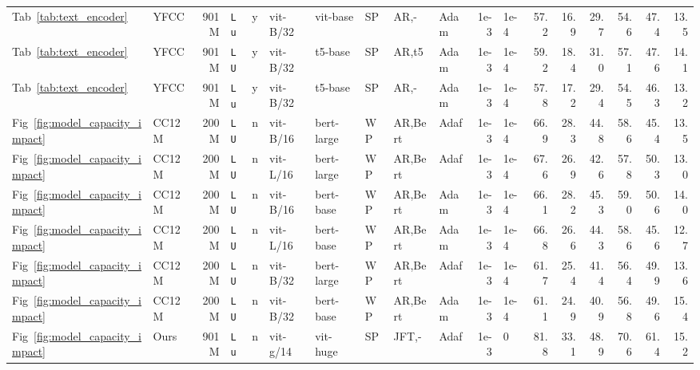 \documentclass[10pt,twocolumn,letterpaper]{article}
\def \Lu {{\tt Lu}\xspace}
\def \LU {{\tt LU}\xspace}
\begin{document}
\begin{table*}
{\begin{tabular}{@{}llrlll@{\hspace{0.3ex}}llllrlrrrrrr@{}}
              Tab~\ref{tab:text_encoder} &    YFCC &   901M &  \Lu &  y &     vit-B/32 &    vit-base &  SP &      AR,- &  Adam & 1e-3 &  1e-4 & 57.2 &            16.9 &            29.7 & 54.6 & 47.4 & 13.5 \\
              Tab~\ref{tab:text_encoder} &    YFCC &   901M &  \LU &  y &     vit-B/32 &     t5-base &  SP &     AR,t5 &  Adam & 1e-3 &  1e-4 & 59.2 &            18.4 &            31.0 & 57.1 & 47.6 & 14.1 \\
              Tab~\ref{tab:text_encoder} &    YFCC &   901M &  \Lu &  y &     vit-B/32 &     t5-base &  SP &      AR,- &  Adam & 1e-3 &  1e-4 & 57.8 &            17.2 &            29.4 & 54.5 & 46.3 & 13.2 \\
    \arrayrulecolor{lightgray}\midrule[0.25pt]\arrayrulecolor{black}
      Fig~\ref{fig:model_capacity_impact} &   CC12M &   200M &  \LU &  n &     vit-B/16 &  bert-large &  WP &   AR,Bert &  Adaf & 1e-3 &  1e-4 & 66.9 &            28.3 &            44.8 & 58.6 & 45.4 & 13.5 \\
      Fig~\ref{fig:model_capacity_impact} &   CC12M &   200M &  \LU &  n &     vit-L/16 &  bert-large &  WP &   AR,Bert &  Adaf & 1e-3 &  1e-4 & 67.6 &            26.9 &            42.6 & 57.8 & 50.3 & 13.0 \\
      Fig~\ref{fig:model_capacity_impact} &   CC12M &   200M &  \LU &  n &     vit-B/16 &   bert-base &  WP &   AR,Bert &  Adam & 1e-3 &  1e-4 & 66.1 &            28.2 &            45.3 & 59.0 & 50.6 & 14.0 \\
      Fig~\ref{fig:model_capacity_impact} &   CC12M &   200M &  \LU &  n &     vit-L/16 &   bert-base &  WP &   AR,Bert &  Adam & 1e-3 &  1e-4 & 66.8 &            26.6 &            44.3 & 58.6 & 45.6 & 12.7 \\
      Fig~\ref{fig:model_capacity_impact} &   CC12M &   200M &  \LU &  n &     vit-B/32 &  bert-large &  WP &   AR,Bert &  Adaf & 1e-3 &  1e-4 & 61.7 &            25.4 &            41.4 & 56.4 & 49.9 & 13.6 \\
      Fig~\ref{fig:model_capacity_impact} &   CC12M &   200M &  \LU &  n &     vit-B/32 &   bert-base &  WP &   AR,Bert &  Adam & 1e-3 &  1e-4 & 61.1 &            24.9 &            40.9 & 56.8 & 49.6 & 15.4 \\
    \arrayrulecolor{lightgray}\midrule[0.25pt]\arrayrulecolor{black}
      Fig~\ref{fig:model_capacity_impact} &    Ours &   901M &  \Lu &  n &     vit-g/14 &    vit-huge &  SP &     JFT,- &  Adaf & 1e-3 &     0 & 81.8 &            33.1 &            48.9 & 70.6 & 61.4 & 15.2 \\

\end{tabular}}
\end{table*}
\end{document}
